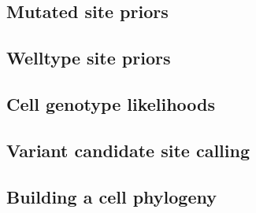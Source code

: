 \documentclass[../main.tex]{subfiles}
\begin{document}


%

\subsection{Mutated site priors}


\subsection{Welltype site priors}


\subsection{Cell genotype likelihoods}


\subsection{Variant candidate site calling}


\subsection{Building a cell phylogeny}


\end{document}
